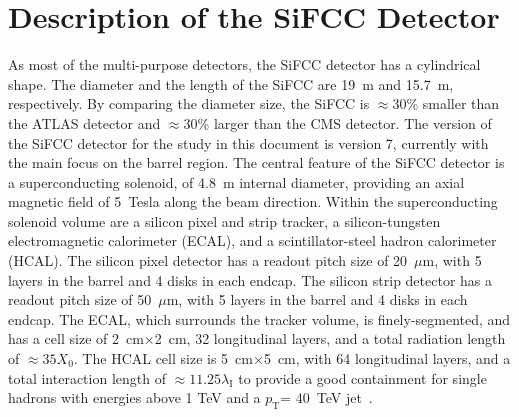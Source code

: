 \documentclass{PoS}
\newcommand{\pt}{\ensuremath{p_{\mathrm{T}}}}
\begin{document}
\section{Description of the SiFCC Detector} 
As most of the multi-purpose detectors, the SiFCC detector has a 
cylindrical shape. The diameter and the length of the SiFCC are 19~m 
and 15.7~m, respectively. By comparing the diameter size, 
the SiFCC is $\approx 30\%$ smaller than the ATLAS detector and 
$\approx 30\%$ larger than the CMS detector. 
The version of the SiFCC detector for the study in this document 
is version 7, currently with the main focus on the barrel region.
%
The central feature of the SiFCC detector is a superconducting solenoid, 
of 4.8~m internal diameter, providing an axial magnetic field of 5~Tesla 
along the beam direction. Within the superconducting solenoid volume are 
a silicon pixel and strip tracker, a silicon-tungsten electromagnetic 
calorimeter (ECAL), and a scintillator-steel hadron calorimeter (HCAL). 
The silicon pixel detector has a readout pitch size of 20~$\mu$m, with
5 layers in the barrel and 4 disks in each endcap. 
The silicon strip detector has a readout pitch size of 50~$\mu$m, with 5 
layers in the barrel and 4 disks in each endcap.
 The ECAL, which surrounds the tracker volume, is finely-segmented, and 
 has a cell size of 2~cm$\times$2~cm, 32 longitudinal layers, and a 
total radiation length of $\approx 35 X_0$. The HCAL cell size is 
5~cm$\times$5~cm, with 64 longitudinal layers, and a total interaction 
length of $\approx 11.25 \lambda_{\mathrm I}$ to provide a good containment 
for single hadrons with energies above 1 TeV and a \pt= 40~TeV 
jet~\cite{bitch}. 
\end{document}
